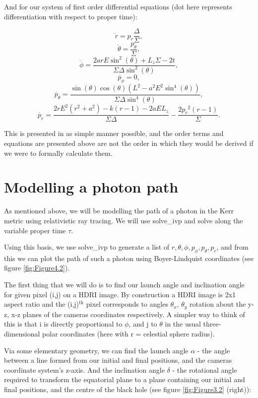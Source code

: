 \documentclass[oneside,openright,frontopenright, singlespacing]{dmathesis}
\begin{document}
\vspace{1em}
	And for our system of first order differential equations (dot here represents differentiation with respect to proper time):

	\[\dot{r} = p_r\frac{\Delta}{\Sigma},\]
	\[\dot{\theta} = \frac{p_\theta}{\Sigma},\]
	\[\dot{\phi} = \frac{2arE\sin^2(\theta)+L_{z}\Sigma-2t}{\Sigma\Delta\sin^2(\theta)},\]
	\[\dot{p_{\phi}} = 0,\]
	\[\dot{p_{\theta}} = \frac{\sin(\theta)\cos(\theta)(L^2-a^2E^2\sin^4(\theta))}{\Sigma\Delta\sin^4(\theta)},\]
	\[\dot{p_{r}} = \frac{2rE^2(r^2+a^2)-k(r-1)-2aEL_{z}}{\Sigma\Delta}-\frac{2{p_{r}}^2(r-1)}{\Sigma}.\]

\vspace{1em}
	This is presented in as simple manner possible, and the order terms and equations are presented above are not the order in which they would be derived if we were to formally calculate them.
	

\section{Modelling a photon path}\label{sec:Section4.6}

	As mentioned above, we will be modelling the path of a photon in the Kerr metric using relativistic ray tracing. We will use solve\_ivp and solve along the variable proper time $\tau$.

\vspace{1em}
	Using this basis, we use solve\_ivp to generate a list of $r, \theta, \phi, p_{\phi}, p_{\theta}, p_{r}$, and from this we can plot the path of such a photon using Boyer-Lindquist coordinates (see figure \ref{fig:Figure4.2}).

\vspace{1em}
	The first thing that we will do is to find our launch angle and inclination angle for given pixel (i,j) on a HDRI image. By construction a HDRI image is 2x1 aspect ratio and the (i,j)$^{\mbox{th}}$ pixel corresponds to angles $\theta_x$, $\theta_y$ rotation about the y-z, x-z planes of the cameras coordinates respectively. A simpler way to think of this is that i is directly proportional to $\phi$, and j to $\theta$ in the usual three-dimensional polar coordinates (here with r = celestial sphere radius).

\vspace{1em}
	Via some elementary geometry, we can find the launch angle $\alpha$ - the angle between a line formed from our initial and final positions, and the cameras coordinate system's z-axis. And the inclination angle $\delta$ - the rotational angle required to transform the equatorial plane to a plane containing our initial and final positions, and the centre of the black hole (see figure \ref{fig:Figure3.2} (right)):
\end{document}
